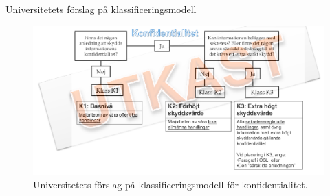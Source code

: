 \documentclass{beamer}
\begin{document}
\begin{frame}{Universitetets förslag på klassificeringsmodell}
  \begin{figure}
    \includegraphics[width=\textwidth]{miun-klassificering.png}
    \caption{Universitetets förslag på klassificeringsmodell för 
    konfidentialitet.}
  \end{figure}
\end{frame}
\end{document}
